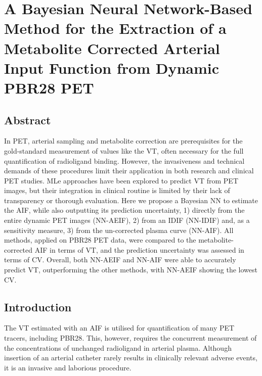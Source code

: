 \chapter{A Bayesian Neural Network-Based Method for the Extraction of a Metabolite Corrected Arterial Input Function from Dynamic PBR28 PET} \label{sec:a_bayesian_neural_network-based_method_for_the_extraction_of_a_metabolite_corrected_arterial_input_function_from_dynamic_pbr28_pet}
    \newpage

    \section{Abstract} \label{sec:a_bayesian_neural_network-based_method_for_the_extraction_of_a_metabolite_corrected_arterial_input_function_from_dynamic_pbr28_pet_appendix_abstract}
        In \gls{PET}, arterial sampling and metabolite correction are prerequisites for the gold-standard measurement of values like the \gls{VT}, often necessary for the full quantification of radioligand binding. However, the invasiveness and technical demands of these procedures limit their application in both research and clinical \gls{PET} studies. \gls{MLe} approaches have been explored to predict \gls{VT} from \gls{PET} images, but their integration in clinical routine is limited by their lack of transparency or thorough evaluation. Here we propose a Bayesian \gls{NN} to estimate the \gls{AIF}, while also outputting its prediction uncertainty, 1) directly from the entire dynamic \gls{PET} images (\gls{NN}-\gls{AE}\gls{IF}), 2) from an \gls{IDIF} (\gls{NN}-\gls{IDIF}) and, as a sensitivity measure, 3) from the un-corrected plasma curve (\gls{NN}-\gls{AIF}). All methods, applied on \gls{PBR28} \gls{PET} data, were compared to the metabolite-corrected \gls{AIF} in terms of \gls{VT}, and the prediction uncertainty was assessed in terms of \gls{CV}. Overall, both \gls{NN}-\gls{AE}\gls{IF} and \gls{NN}-\gls{AIF} were able to accurately predict \gls{VT}, outperforming the other methods, with \gls{NN}-\gls{AE}\gls{IF} showing the lowest \gls{CV}.

    \section{Introduction} \label{sec:a_bayesian_neural_network-based_method_for_the_extraction_of_a_metabolite_corrected_arterial_input_function_from_dynamic_pbr28_pet_appendix_introduction}
        The \gls{VT} estimated with an \gls{AIF} is utilised for quantification of many \gls{PET} tracers, including \gls{PBR28}. This, however, requires the concurrent measurement of the concentrations of unchanged radioligand in arterial plasma. Although insertion of an arterial catheter rarely results in clinically relevant adverse events, it is an invasive and laborious procedure. 
    
